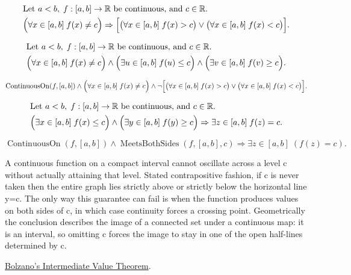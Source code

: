 \begin{remark*}
\[
\begin{aligned}
&\text{Let } a<b,\; f:[a,b]\to\mathbb{R} \text{ be continuous, and } c\in\mathbb{R}.\\
&\Bigl(\forall x\in[a,b]\; f(x)\neq c\Bigr)
\Rightarrow
\Bigl[\bigl(\forall x\in[a,b]\; f(x)>c\bigr)\lor\bigl(\forall x\in[a,b]\; f(x)<c\bigr)\Bigr].
\end{aligned}
\]
\end{remark*}

\begin{remark*}
\[
\begin{aligned}
&\text{Let } a<b,\; f:[a,b]\to\mathbb{R} \text{ be continuous, and } c\in\mathbb{R}.\\
&\Bigl(\forall x\in[a,b]\; f(x)\neq c\Bigr)
\land
\Bigl(\exists u\in[a,b]\; f(u)\le c\Bigr)
\land
\Bigl(\exists v\in[a,b]\; f(v)\ge c\Bigr).
\end{aligned}
\]
\end{remark*}

\begin{remark*}
\[
\operatorname{ContinuousOn}(f,[a,b])
\land
\Bigl(\forall x\in[a,b]\; f(x)\neq c\Bigr)
\land
\neg\Bigl[
\bigl(\forall x\in[a,b]\; f(x)>c\bigr)
\lor
\bigl(\forall x\in[a,b]\; f(x)<c\bigr)
\Bigr].
\]
\end{remark*}

\begin{remark*}
\[
\begin{aligned}
&\text{Let } a<b,\; f:[a,b]\to\mathbb{R} \text{ be continuous, and } c\in\mathbb{R}.\\
&\Bigl(\exists x\in[a,b]\; f(x)\le c\Bigr)
\land
\Bigl(\exists y\in[a,b]\; f(y)\ge c\Bigr)
\Rightarrow
\exists z\in[a,b]\; f(z)=c.
\end{aligned}
\]
\end{remark*}

\begin{remark*}
\[
\operatorname{ContinuousOn}(f,[a,b])
\land
\operatorname{MeetsBothSides}(f,[a,b],c)
\Longrightarrow
\exists z\in[a,b]\;(f(z)=c).
\]
\end{remark*}

\begin{remark*}[Interpretation]
A continuous function on a compact interval cannot oscillate across a level c without actually attaining that level. Stated contrapositive fashion, if c is never taken then the entire graph lies strictly above or strictly below the horizontal line y=c. The only way this guarantee can fail is when the function produces values on both sides of c, in which case continuity forces a crossing point. Geometrically the conclusion describes the image of a connected set under a continuous map: it is an interval, so omitting c forces the image to stay in one of the open half-lines determined by c.
\end{remark*}

\begin{dependencies}
\hyperref[thm:bolzano-intermediate-value]{Bolzano's Intermediate Value Theorem}.
\end{dependencies}
